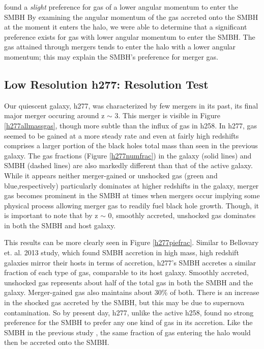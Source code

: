 \documentclass[manuscript]{aastex}
\begin{document}
\citep{Bellovary2013} found a \textit{slight} preference for gas of a lower angular momentum to enter the SMBH By examining the angular momentum of the gas accreted onto the SMBH at the moment it enters the halo, we were able to determine that a significant preference exists for gas with lower angular momentum to enter the SMBH. The gas attained through mergers tends to enter the halo with a lower angular momentum; this may explain the SMBH's preference for merger gas. 


\subsection{Low Resolution h277: Resolution Test}
	
Our quiescent galaxy, h277, was characterized by few mergers in its past, its final major merger occuring around z $\sim$ 3. This merger is visible in Figure \ref{h277allmassgas}, though more subtle than the influx of gas in h258. In h277, gas seemed to be gained at a more steady rate and even at fairly high redshifts comprises a larger portion of the black holes total mass than seen in the previous galaxy. The gas fractions (Figure \ref{h277numfrac}) in the galaxy (solid lines) and SMBH (dashed lines) are also markedly different than that of the active galaxy. While it appears neither merger-gained or unshocked gas (green and blue,respectively) particularly dominates at higher redshifts in the galaxy, merger gas becomes prominent in the SMBH at times when mergers occur implying some physical process allowing merger gas to readily fuel black hole growth. Though, it is important to note that by z $\sim$ 0, smoothly accreted, unshocked gas dominates in both the SMBH and host galaxy.

This results can be more clearly seen in Figure \ref{h277piefrac}. Similar to Bellovary et. al. 2013 study, which found SMBH accretion in high mass, high redshift galaxies mirror their hosts in terms of accretion, h277's SMBH accretes a similar fraction of each type of gas, comparable to its host galaxy. Smoothly accreted, unshocked gas represents about half of the total gas in both the SMBH and the galaxy. Merger-gained gas also maintains about 30\% of both. There is an increase in the shocked gas accreted by the SMBH, but this may be due to supernova contamination. So by present day, h277, unlike the active h258, found no strong preference for the SMBH to prefer any one kind of gas in its accretion. Like the SMBH in the previous study , the same fraction of gas entering the halo would then be accreted onto the SMBH.  
\end{document}
